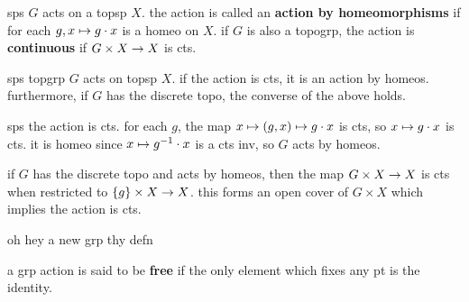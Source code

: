 \begin{defn}
    sps $G$ acts on a topsp $X$. the action is called an \textbf{action by
    homeomorphisms} if for each $g, x\mapsto g \cdot x$ is a homeo on $X$. if $G$
    is also a topogrp, the action is \textbf{continuous} if $G\times X\rightarrow X$ is
    cts.
\end{defn}

\begin{prop}
    sps topgrp $G$ acts on topsp $X$. if the action is cts, it is an action by
    homeos. furthermore, if $G$ has the discrete topo, the converse of the above
    holds.
\end{prop}

\begin{pf}[source=Primary Source Material]
    sps the action is cts. for each $g$, the map $x\mapsto(g,x)\mapsto g \cdot x$ is
    cts, so $x\mapsto g \cdot x$ is cts. it is homeo since $x\mapsto g^{-1}\cdot x$ is
    a cts inv, so $G$ acts by homeos.

    if $G$ has the discrete topo and acts by homeos, then the map $G\times X \rightarrow
    X$ is cts when restricted to $\left\{{g}\right\}\times X\rightarrow X$. this forms an open
    cover of $G\times X$ which implies the action is cts.
\end{pf}
oh hey a new grp thy defn

\begin{defn}
    a grp action is said to be \textbf{free} if the only element which fixes any
    pt is the identity.
\end{defn}


